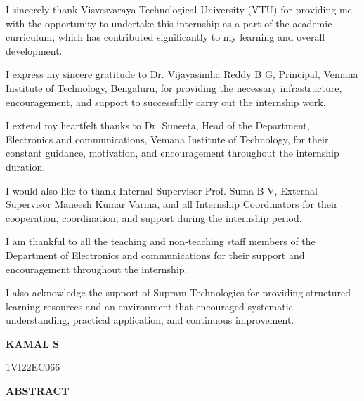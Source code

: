 \documentclass[12pt,a4paper]{report}
\begin{document}
\vspace{0.5cm}
\setlength{\parindent}{1.5em}
\begin{onehalfspacing}
I sincerely thank Visvesvaraya Technological University (VTU) for providing me with the opportunity to undertake this internship as a part of the academic curriculum, which has contributed significantly to my learning and overall development.

I express my sincere gratitude to Dr. Vijayasimha Reddy B G, Principal, Vemana Institute of Technology, Bengaluru, for providing the necessary infrastructure, encouragement, and support to successfully carry out the internship work.

I extend my heartfelt thanks to Dr. Suneeta, Head of the Department, Electronics and communications, Vemana Institute of Technology, for their constant guidance, motivation, and encouragement throughout the internship duration.

I would also like to thank Internal Supervisor Prof. Suma B V, External Supervisor Maneesh Kumar Varma, and all Internship Coordinators for their cooperation, coordination, and support during the internship period.

I am thankful to all the teaching and non-teaching staff members of the Department of Electronics and communications for their support and encouragement throughout the internship.

I also acknowledge the support of Supram Technologies for providing structured learning resources and an environment that encouraged systematic understanding, practical application, and continuous improvement.
\end{onehalfspacing}

\vspace{1cm}
\begin{flushright}
\textbf{KAMAL S}\par
1VI22EC066\par
\end{flushright}

\newpage
\begin{center}
{\LARGE \textbf{ABSTRACT}\par}
\end{center}

\vspace{0.5cm}
\setlength{\parindent}{1.5em}
\end{document}
